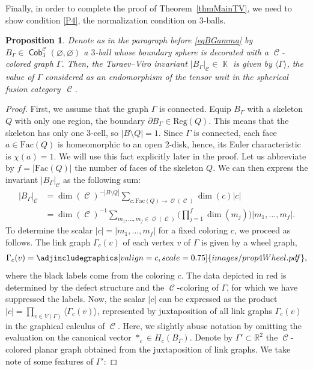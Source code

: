 \documentclass[10pt,a4paper]{amsart}
\DeclareMathOperator{\K}{\mathbb{K}}
\DeclareMathOperator{\Cob}{\mathsf{Cob}}
\DeclareMathOperator{\calc}{\mathcal{C}}
\DeclareMathOperator{\calo}{\mathcal{O}}
\numberwithin{equation}{section}
\newtheorem{Proposition}[Proposition]{Proposition}
\theoremstyle{definition}
\begin{document}
Finally, in order to complete the proof of Theorem~\ref{thmMainTV}, we need to show condition \ref{P4}, the normalization condition on 3-balls.
\begin{Proposition} \label{propProp4TV}
Denote as in the paragraph before \eqref{eqBGamma} by $B_{\Gamma} \in \Cob_3^{\calc}(\varnothing, \varnothing)$ a $3$-ball whose boundary sphere is decorated with a $\calc$-colored graph $\Gamma$. Then, the Turaev--Viro invariant ${|B_{\Gamma}|_{\calc} \in \K}$ is given by $\langle \Gamma \rangle$, the value of $\Gamma$ considered as an endomorphism of the tensor unit in the spherical fusion category~$\calc$.
\end{Proposition}
\begin{proof}
 First, we assume that the graph $\Gamma$ is connected. Equip $B_{\Gamma}$ with a skeleton $Q$ with only one region, the boundary $\partial B_{\Gamma} \in \mathrm{Reg}(Q)$. This means that the skeleton has only one 3-cell, so $|B\setminus Q| = 1$. Since $\Gamma$ is connected, each face $a \in \mathrm{Fac}(Q)$ is homeomorphic to an open 2-disk, hence, its Euler characteristic is $\chi(a) = 1$. We will use this fact explicitly later in the proof. Let us abbreviate by $f = |\mathrm{Fac}(Q)|$ the number of faces of the skeleton $Q$. We can then express the invariant $|B_{\Gamma}|_{\calc}$ as the following sum:
 \begin{align}
 \label{eqInvBGamma}
 |B_{\Gamma}|_{\calc} &= \dim(\calc)^{-|B\setminus Q|}\sum_{c\colon \mathrm{Fac}(Q) \rightarrow \calo(\calc)} \dim(c) |c| \nonumber \\
 &= \dim(\calc)^{-1}\sum_{m_1, \dots, m_f \in \calo(\calc)} \biggl(\prod_{j = 1}^f \dim(m_j) \biggr) |m_1, \dots, m_f|.
 \end{align}
 To determine the scalar $|c| = |m_1, \dots, m_f|$ for a fixed coloring $c$, we proceed as follows. The link graph $\Gamma_c(v)$ of each vertex $v$ of $\Gamma$ is given by a wheel graph,
 \begin{align*}
 \Gamma_c(v) = \adjincludegraphics[valign=c, scale = 0.75]{images/prop4Wheel.pdf},
 \end{align*}
 where the black labels come from the coloring $c$. The data depicted in red is determined by the defect structure and the $\calc$-coloring of $\Gamma$, for which we have suppressed the labels. Now, the scalar $|c|$ can be expressed as the product $|c| = \prod_{v \in V(\Gamma)}\langle \Gamma_c(v) \rangle$, represented by juxtaposition of all link graphs $\Gamma_c(v)$ in the graphical calculus of $\calc$. Here, we slightly abuse notation by omitting the evaluation on the canonical vector $*_c \in H_c(B_{\Gamma})$. Denote by $\Gamma' \subset \mathbb{R}^2$ the $\calc$-colored planar graph obtained from the juxtaposition of link graphs. We take note of some features of $\Gamma'$:

\end{proof}
\end{document}
